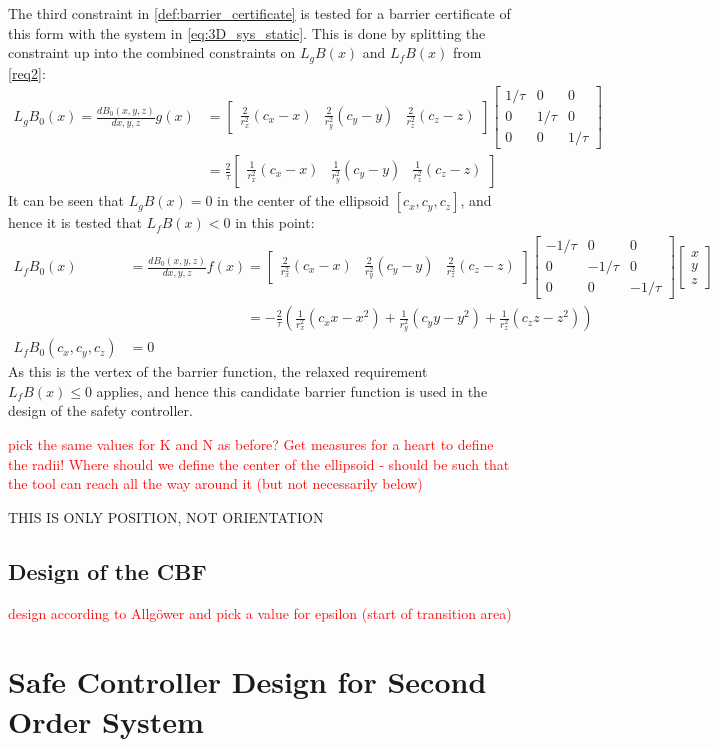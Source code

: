 The third constraint in \autoref{def:barrier_certificate} is tested for a barrier certificate of this form with the system in \autoref{eq:3D_sys_static}. This is done by splitting the constraint up into the combined constraints on $L_gB(x)$ and $L_fB(x)$ from \autoref{req2}:
\begin{align}
L_gB_0(x) = \frac{dB_0(x,y,z)}{dx,y,z}g(x) &= 
\begin{bmatrix} 
\frac{2}{r_x^2}(c_x-x) & \frac{2}{r_y^2}(c_y-y) & \frac{2}{r_z^2}(c_z-z) 
\end{bmatrix}
\begin{bmatrix}
1/\tau& 0 & 0 \\ 0& 1/\tau & 0 \\0& 0& 1/\tau
\end{bmatrix} \nonumber\\
&= \frac{2}{\tau}
\begin{bmatrix} 
\frac{1}{r_x^2}(c_x-x) & \frac{1}{r_y^2}(c_y-y) & \frac{1}{r_z^2}(c_z-z) 
\end{bmatrix}
\end{align}
It can be seen that $L_gB(x)=0$ in the center of the ellipsoid $[c_x,c_y,c_z]$, and hence it is tested that $L_fB(x)<0$ in this point:
\begin{align}
L_fB_0(x) &= \frac{dB_0(x,y,z)}{dx,y,z}f(x) = 
\begin{bmatrix} 
\frac{2}{r_x^2}(c_x-x) & \frac{2}{r_y^2}(c_y-y) & \frac{2}{r_z^2}(c_z-z) 
\end{bmatrix}
\begin{bmatrix}
-1/\tau& 0 & 0 \\ 0& -1/\tau & 0 \\0& 0& -1/\tau
\end{bmatrix} 
\begin{bmatrix}
x\\y\\z
\end{bmatrix}\nonumber\\
& \phantom{=\frac{dB_0(x,y,z)}{dx,y,z}f(x)} =
-\frac{2}{\tau} \left(
\frac{1}{r_x^2}(c_xx-x^2) +\frac{1}{r_y^2}(c_yy-y^2) + \frac{1}{r_z^2}(c_zz-z^2) \right)\\
L_fB_0(c_x,c_y,c_z)&= 0 \nonumber
\end{align}
As this is the vertex of the barrier function, the relaxed requirement $L_fB(x)\leq 0$ applies, and hence this candidate barrier function is used in the design of the safety controller.

\textcolor{red}{pick the same values for K and N as before? Get measures for a heart to define the radii! Where should we define the center of the ellipsoid - should be such that the tool can reach all the way around it (but not necessarily below)}



THIS IS ONLY POSITION, NOT ORIENTATION

\subsection{Design of the CBF}
\textcolor{red}{design according to Allg\" ower and pick a value for epsilon (start of transition area)}

\section{Safe Controller Design for Second Order System}